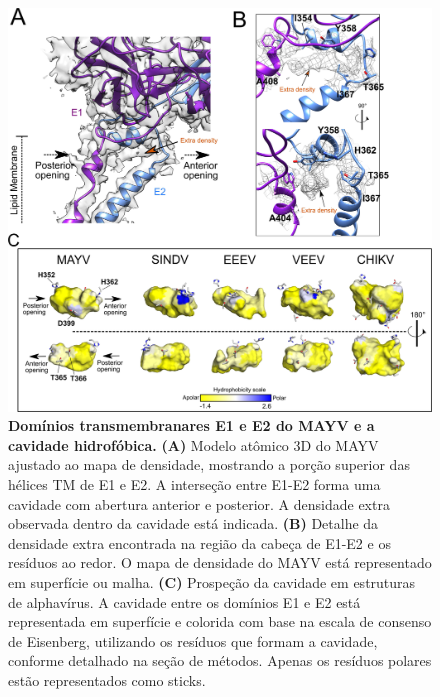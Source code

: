 \documentclass[Portugues]{phdquali}
\begin{document}
\begin{figure}
  \centerline{\includegraphics[scale=0.2]{images/mayv-e1-e2-analysis.png}}
  \caption[Domínios transmembranares E1 e E2 do MAYV e a cavidade hidrofóbica]{\textbf{Domínios transmembranares E1 e E2 do MAYV e a cavidade hidrofóbica.} \textbf{(A)} Modelo atômico 3D do MAYV ajustado ao mapa de densidade, mostrando a porção superior das hélices TM de E1 e E2. A interseção entre E1-E2 forma uma cavidade com abertura anterior e posterior. A densidade extra observada dentro da cavidade está indicada. \textbf{(B)} Detalhe da densidade extra encontrada na região da cabeça de E1-E2 e os resíduos ao redor. O mapa de densidade do MAYV está representado em superfície ou malha. \textbf{(C)} Prospeção da cavidade em estruturas de alphavírus. A cavidade entre os domínios E1 e E2 está representada em superfície e colorida com base na escala de consenso de Eisenberg, utilizando os resíduos que formam a cavidade, conforme detalhado na seção de métodos. Apenas os resíduos polares estão representados como sticks.}
  \label{fig:mayv-e1-e2-analysis}
\end{figure}
\end{document}
